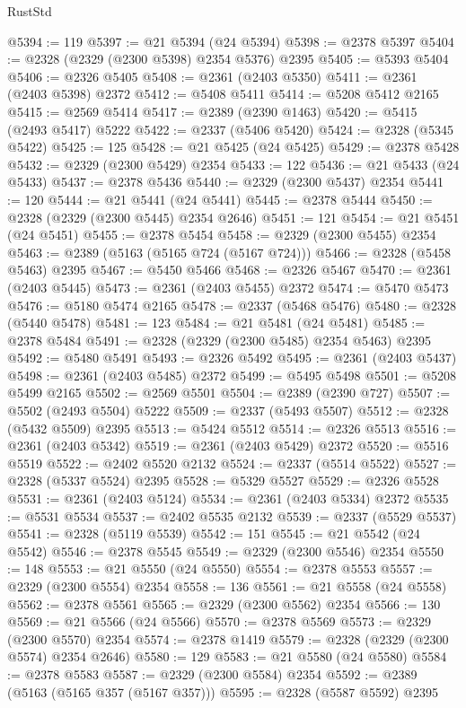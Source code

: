 \begin{lexlean}{RustStd}
\begin{coremodule}
{\begin{coremodule}
{{{{{{{{{{{{{{{{{{{{{{{{{{{{{{{{{{{{{@5394 := 119
@5397 := @21 @5394 (@24 @5394)
@5398 := @2378 @5397
@5404 := @2328 (@2329 (@2300 @5398) @2354 @5376) @2395
@5405 := @5393 @5404
@5406 := @2326 @5405
@5408 := @2361 (@2403 @5350)
@5411 := @2361 (@2403 @5398) @2372
@5412 := @5408 @5411
@5414 := @5208 @5412 @2165
@5415 := @2569 @5414
@5417 := @2389 (@2390 @1463)
@5420 := @5415 (@2493 @5417) @5222
@5422 := @2337 (@5406 @5420)
@5424 := @2328 (@5345 @5422)
@5425 := 125
@5428 := @21 @5425 (@24 @5425)
@5429 := @2378 @5428
@5432 := @2329 (@2300 @5429) @2354
@5433 := 122
@5436 := @21 @5433 (@24 @5433)
@5437 := @2378 @5436
@5440 := @2329 (@2300 @5437) @2354
@5441 := 120
@5444 := @21 @5441 (@24 @5441)
@5445 := @2378 @5444
@5450 := @2328 (@2329 (@2300 @5445) @2354 @2646)
@5451 := 121
@5454 := @21 @5451 (@24 @5451)
@5455 := @2378 @5454
@5458 := @2329 (@2300 @5455) @2354
@5463 := @2389 (@5163 (@5165 @724 (@5167 @724)))
@5466 := @2328 (@5458 @5463) @2395
@5467 := @5450 @5466
@5468 := @2326 @5467
@5470 := @2361 (@2403 @5445)
@5473 := @2361 (@2403 @5455) @2372
@5474 := @5470 @5473
@5476 := @5180 @5474 @2165
@5478 := @2337 (@5468 @5476)
@5480 := @2328 (@5440 @5478)
@5481 := 123
@5484 := @21 @5481 (@24 @5481)
@5485 := @2378 @5484
@5491 := @2328 (@2329 (@2300 @5485) @2354 @5463) @2395
@5492 := @5480 @5491
@5493 := @2326 @5492
@5495 := @2361 (@2403 @5437)
@5498 := @2361 (@2403 @5485) @2372
@5499 := @5495 @5498
@5501 := @5208 @5499 @2165
@5502 := @2569 @5501
@5504 := @2389 (@2390 @727)
@5507 := @5502 (@2493 @5504) @5222
@5509 := @2337 (@5493 @5507)
@5512 := @2328 (@5432 @5509) @2395
@5513 := @5424 @5512
@5514 := @2326 @5513
@5516 := @2361 (@2403 @5342)
@5519 := @2361 (@2403 @5429) @2372
@5520 := @5516 @5519
@5522 := @2402 @5520 @2132
@5524 := @2337 (@5514 @5522)
@5527 := @2328 (@5337 @5524) @2395
@5528 := @5329 @5527
@5529 := @2326 @5528
@5531 := @2361 (@2403 @5124)
@5534 := @2361 (@2403 @5334) @2372
@5535 := @5531 @5534
@5537 := @2402 @5535 @2132
@5539 := @2337 (@5529 @5537)
@5541 := @2328 (@5119 @5539)
@5542 := 151
@5545 := @21 @5542 (@24 @5542)
@5546 := @2378 @5545
@5549 := @2329 (@2300 @5546) @2354
@5550 := 148
@5553 := @21 @5550 (@24 @5550)
@5554 := @2378 @5553
@5557 := @2329 (@2300 @5554) @2354
@5558 := 136
@5561 := @21 @5558 (@24 @5558)
@5562 := @2378 @5561
@5565 := @2329 (@2300 @5562) @2354
@5566 := 130
@5569 := @21 @5566 (@24 @5566)
@5570 := @2378 @5569
@5573 := @2329 (@2300 @5570) @2354
@5574 := @2378 @1419
@5579 := @2328 (@2329 (@2300 @5574) @2354 @2646)
@5580 := 129
@5583 := @21 @5580 (@24 @5580)
@5584 := @2378 @5583
@5587 := @2329 (@2300 @5584) @2354
@5592 := @2389 (@5163 (@5165 @357 (@5167 @357)))
@5595 := @2328 (@5587 @5592) @2395
}}}}}}}}}}}}}}}}}}}}}}}}}}}}}}}}}}}}}
\end{coremodule}}
\end{coremodule}
\end{lexlean}
